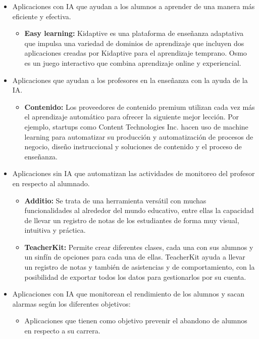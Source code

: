 \begin{itemize}
\item Aplicaciones con IA que ayudan a los alumnos a aprender de una
  manera más eficiente y efectiva.
\begin{itemize}
\item \textbf{Easy learning:} Kidaptive es una plataforma de enseñanza
  adaptativa que impulsa una variedad de dominios de aprendizaje que
  incluyen dos aplicaciones creadas por Kidaptive para el aprendizaje
  temprano. Osmo es un juego interactivo que combina aprendizaje
  online y experiencial.
\end{itemize}
\item Aplicaciones que ayudan a los profesores en la enseñanza con la
  ayuda de la IA.
\begin{itemize}
\item \textbf{Contenido:} Los proveedores de contenido premium
  utilizan cada vez más el aprendizaje automático para ofrecer la
  siguiente mejor lección. Por ejemplo, startups como Content
  Technologies Inc. hacen uso de machine learning para automatizar su
  producción y automatización de procesos de negocio, diseño
  instruccional y soluciones de contenido y el proceso de enseñanza.
\end{itemize}
\item Aplicaciones sin IA que automatizan las actividades de monitoreo
  del profesor en respecto al
  alumnado.\cite{appsEvaluacionEstudiantes}
\begin{itemize}
\item \textbf{Additio:} Se trata de una herramienta versátil con
  muchas funcionalidades al alrededor del mundo educativo, entre ellas
  la capacidad de llevar un registro de notas de los estudiantes de
  forma muy visual, intuitiva y práctica.
\item \textbf{TeacherKit:} Permite crear diferentes clases, cada una
  con sus alumnos y un sinfín de opciones para cada una de
  ellas. TeacherKit ayuda a llevar un registro de notas y también de
  asistencias y de comportamiento, con la posibilidad de exportar
  todos los datos para gestionarlos por su cuenta.
\end{itemize}
\item Aplicaciones con IA que monitorean el rendimiento de los alumnos
  y sacan alarmas según los diferentes objetivos:
\begin{itemize}
\item Aplicaciones que tienen como objetivo prevenir el abandono de
  alumnos en respecto a su carrera.

\end{itemize}
\end{itemize}
